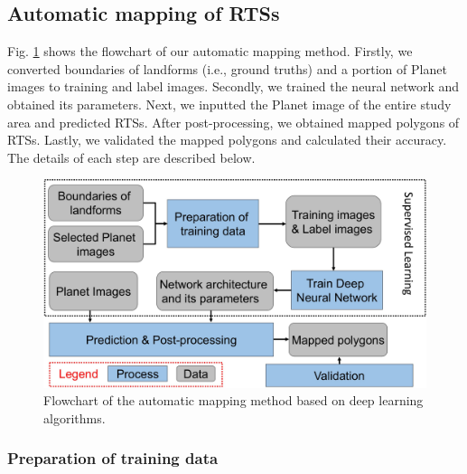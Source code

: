 \documentclass[authoryear,preprint,review,12pt]{elsarticle}
\begin{document}
\subsection{Automatic mapping of RTSs}
\label{subsec_auto_mapping}

Fig. \ref{fig_flowchart} shows the flowchart of our automatic mapping method. Firstly, we converted boundaries of landforms (i.e., ground truths) and a portion of Planet images to training and label images. Secondly, we trained the neural network and obtained its parameters. Next, we inputted the Planet image of the entire study area and predicted RTSs. After post-processing, we obtained mapped polygons of RTSs. Lastly, we validated the mapped polygons and calculated their accuracy. The details of each step are described below.

\begin{figure}[ht]
	\centering
	\includegraphics[width=12cm]{figures/flowchart_trim.jpg}
	\caption{Flowchart of the automatic mapping method based on deep learning algorithms.}
	\label{fig_flowchart}
\end{figure}

\subsubsection{Preparation of training data}
\label{subsubsec_pre_trainingdata}
\end{document}

